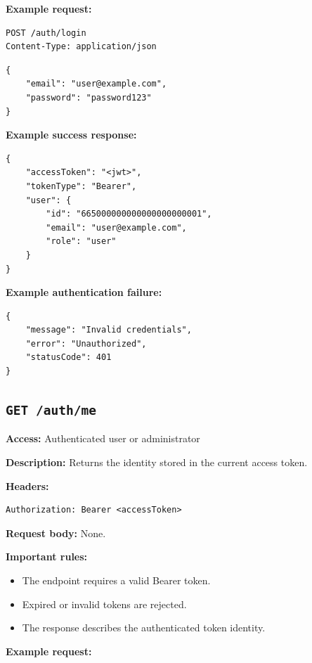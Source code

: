 \textbf{Example request:}

\begin{verbatim}
POST /auth/login
Content-Type: application/json
\end{verbatim}

\begin{verbatim}
{
	"email": "user@example.com",
	"password": "password123"
}
\end{verbatim}

\pagebreak
\textbf{Example success response:}

\begin{verbatim}
{
	"accessToken": "<jwt>",
	"tokenType": "Bearer",
	"user": {
		"id": "665000000000000000000001",
		"email": "user@example.com",
		"role": "user"
	}
}
\end{verbatim}

\textbf{Example authentication failure:}

\begin{verbatim}
{
	"message": "Invalid credentials",
	"error": "Unauthorized",
	"statusCode": 401
}
\end{verbatim}

\subsection{\texttt{GET /auth/me}}

\textbf{Access:} Authenticated user or administrator

\textbf{Description:} Returns the identity stored in the current access token.

\textbf{Headers:}

\begin{verbatim}
Authorization: Bearer <accessToken>
\end{verbatim}

\textbf{Request body:} None.

\textbf{Important rules:}

\begin{itemize}
    \item The endpoint requires a valid Bearer token.
    \item Expired or invalid tokens are rejected.
    \item The response describes the authenticated token identity.
\end{itemize}

\textbf{Example request:}


